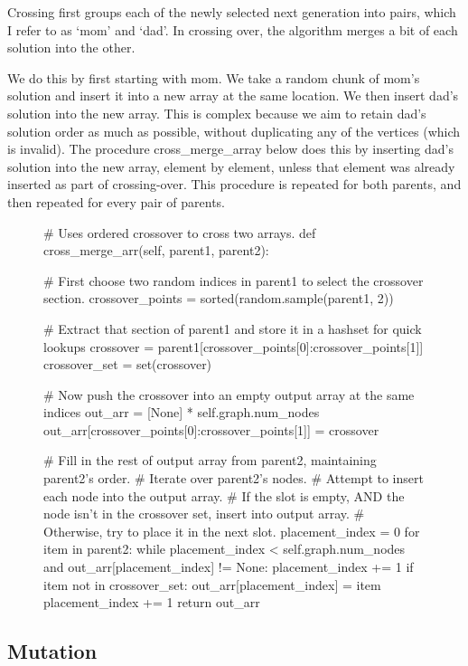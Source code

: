 Crossing first groups each of the newly selected next generation into pairs, which I refer to as `mom' and `dad'. In crossing over, the algorithm merges a bit of each solution into the other.

We do this by first starting with mom. We take a random chunk of mom's solution and insert it into a new array at the same location. We then insert dad's solution into the new array. This is complex because we aim to retain dad's solution order as much as possible, without duplicating any of the vertices (which is invalid). The procedure cross\_merge\_array below does this by inserting dad's solution into the new array, element by element, unless that element was already inserted as part of crossing-over. This procedure is repeated for both parents, and then repeated for every pair of parents. 

\begin{figure}[H]
\begin{python}
# Uses ordered crossover to cross two arrays.
def cross_merge_arr(self, parent1, parent2):

  # First choose two random indices in parent1 to select the crossover section.
  crossover_points = sorted(random.sample(parent1, 2))
  
  # Extract that section of parent1 and store it in a hashset for quick lookups
  crossover = parent1[crossover_points[0]:crossover_points[1]]
  crossover_set = set(crossover)                
  
  # Now push the crossover into an empty output array at the same indices
  out_arr = [None] * self.graph.num_nodes
  out_arr[crossover_points[0]:crossover_points[1]] = crossover

  # Fill in the rest of output array from parent2, maintaining parent2's order.
  # Iterate over parent2's nodes.
  # Attempt to insert each node into the output array. 
  # If the slot is empty, AND the node isn't in the crossover set, insert into output array.
  # Otherwise, try to place it in the next slot.
  placement_index = 0
  for item in parent2:
    while placement_index < self.graph.num_nodes and out_arr[placement_index] != None:
      placement_index += 1
    if item not in crossover_set:
      out_arr[placement_index] = item
      placement_index += 1
  return out_arr
\end{python} 
\end{figure}

\subsection{Mutation}


